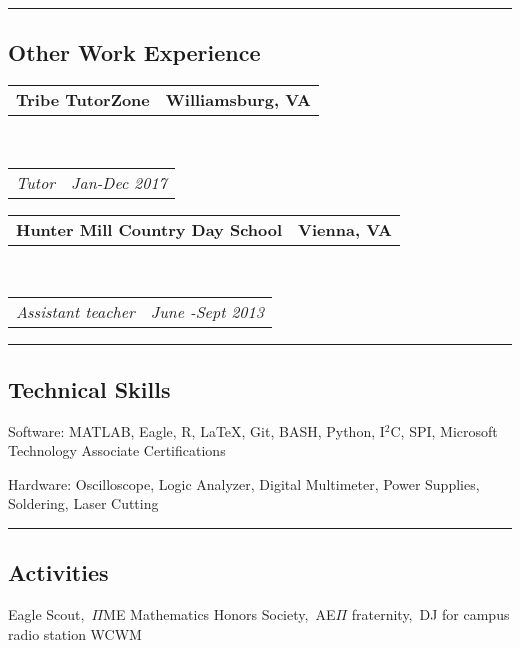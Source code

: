 \documentclass[10pt,letterpaper]{article}
\makeatletter
\newenvironment{indentsection}[1]%
{\begin{list}{}%
	{\setlength{\leftmargin}{#1}}%
	\item[]%
}
{\end{list}}
\newcommand{\headerrow}[2]
{\begin{tabular*}{\linewidth}{l@{\extracolsep{\fill}}r}
	#1 &
	#2 \\
\end{tabular*}}
\makeatother
\begin{document}
\hrule
\vspace{-0.4em}
\subsection*{Other Work Experience}

	\headerrow
		{\textbf{Tribe TutorZone}}
		{\textbf{Williamsburg, VA}}
	\\
	\headerrow
		{\emph{Tutor}}
		{\emph{Jan-Dec 2017}}
	\headerrow
		{\textbf{Hunter Mill Country Day School}}
		{\textbf{Vienna, VA}}
	\\
	\headerrow
		{\emph{Assistant teacher}}
		{\emph{June -Sept 2013}}
	
\hrule
\vspace{-0.4em}
\subsection*{Technical Skills}

\begin{description*}
	\item[Software:]
	MATLAB, Eagle, R, \LaTeX, Git, BASH, Python, I$^2$C, SPI, Microsoft Technology Associate Certifications
	\item[Hardware:]
	Oscilloscope, Logic Analyzer, Digital Multimeter, Power Supplies, Soldering, Laser Cutting
\end{description*}

\hrule
\vspace{-0.4em}
\subsection*{Activities}
\indent Eagle Scout,\, $\Pi$ME Mathematics Honors Society,\, AE$\Pi$ fraternity,\, DJ for campus radio station WCWM
\end{document}
